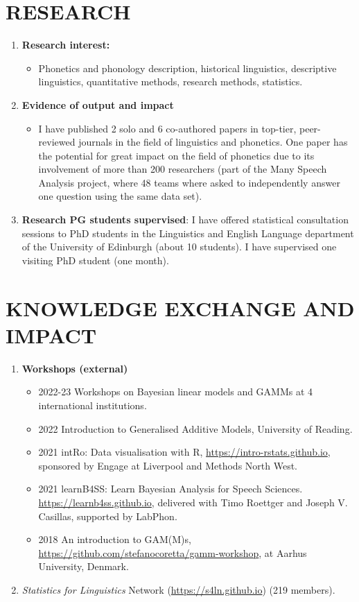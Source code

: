 \documentclass{article}
\begin{document}
\section{RESEARCH}

\begin{enumerate}
\item \textbf{Research interest:}
	\begin{itemize}
		\item Phonetics and phonology description, historical linguistics, descriptive linguistics, quantitative methods, research methods, statistics.
	\end{itemize}
\item \textbf{Evidence of output and impact}
	\begin{itemize}
		\item I have published 2 solo and 6 co-authored papers in top-tier, peer-reviewed journals in the field of linguistics and phonetics. One paper has the potential for great impact on the field of phonetics due to its involvement of more than 200 researchers (part of the Many Speech Analysis project, where 48 teams where asked to independently answer one question using the same data set).
	\end{itemize}
\item \textbf{Research PG students supervised}: I have offered statistical consultation sessions to PhD students in the Linguistics and English Language department of the University of Edinburgh (about 10 students). I have supervised one visiting PhD student (one month).
\end{enumerate}

\section{KNOWLEDGE EXCHANGE AND IMPACT}

\begin{enumerate}
\item \textbf{Workshops (external)}
	\begin{itemize}
  \item 2022-23 Workshops on Bayesian linear models and GAMMs at 4 international institutions.
  \item 2022 Introduction to Generalised Additive Models, University of Reading.
	\item 2021 intRo: Data visualisation with R, \url{https://intro-rstats.github.io}, sponsored by Engage at Liverpool and Methods North West.
	\item 2021 learnB4SS: Learn Bayesian Analysis for Speech Sciences. \url{https://learnb4ss.github.io}, delivered with Timo Roettger and Joseph V. Casillas, supported by LabPhon.
	\item 2018 An introduction to GAM(M)s, \url{https://github.com/stefanocoretta/gamm-workshop}, at Aarhus University, Denmark.
	\end{itemize}
\item \textit{Statistics for Linguistics} Network (\url{https://s4ln.github.io}) (219 members).
\end{enumerate}
\end{document}
